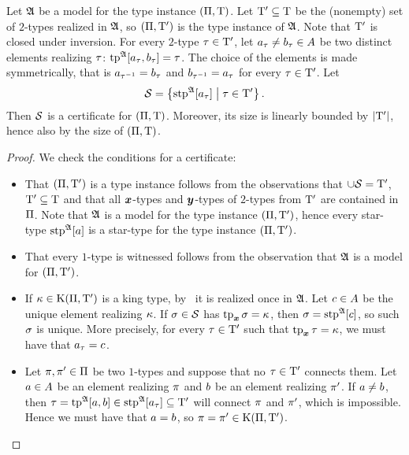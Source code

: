 \begin{lemma}\label{lem:cert-extract}
Let $\mathfrak{A}$ be a model for the type instance $(\Pi,\mathrm{T})$.
Let ${\mathrm{T}'} \subseteq \mathrm{T}$ be the (nonempty) set of $2$-types realized in
$\mathfrak{A}$, so $(\Pi,{\mathrm{T}'})$ is the type instance of $\mathfrak{A}$.
Note that ${\mathrm{T}'}$ is closed under inversion.
For every $2$-type $\tau \in {\mathrm{T}'}$,
let $a_{\tau} \neq b_{\tau} \in A$ be two distinct elements realizing
$\tau$: $\operatorname{tp}^{\mathfrak{A}}[a_{\tau},b_{\tau}] = \tau$. The choice of the
elements is made symmetrically, that is $a_{\tau^{-1}} = b_{\tau}$ and
$b_{\tau^{-1}} = a_{\tau}$ for every $\tau\in{\mathrm{T}'}$.
Let 
\[
  \mathcal{S} = \left\{\operatorname{stp}^{\mathfrak{A}}[a_{\tau}]\mathrel{}\middle|\mathrel{}\tau\in{\mathrm{T}'}\right\}.
\]
Then $\mathcal{S}$ is a certificate for $(\Pi,\mathrm{T})$. Moreover, its size is
linearly bounded by $\left|{\mathrm{T}'}\right|$, hence also by the size of $(\Pi,\mathrm{T})$.
\end{lemma}
\begin{proof}
We check the conditions for a certificate:
\begin{itemize}
  \item[\refcertcond1] That $(\Pi,{\mathrm{T}'})$ is a type instance follows from
  the observations that $\cup\mathcal{S} = {\mathrm{T}'}$, ${\mathrm{T}'} \subseteq \mathrm{T}$ and that all $\bm{x}$-types
  and $\bm{y}$-types of $2$-types from ${\mathrm{T}'}$ are contained in $\Pi$. Note that
  $\mathfrak{A}$ is a model for the type instance $(\Pi,{\mathrm{T}'})$, hence every
  star-type $\operatorname{stp}^{\mathfrak{A}}[a]$ is a star-type for the type instance
  $(\Pi,{\mathrm{T}'})$.
  \item[\refcertcond2] That every $1$-type is witnessed follows from the
  observation that $\mathfrak{A}$ is a model for $(\Pi,{\mathrm{T}'})$.
  \item[\refcertcond3] If $\kappa \in \mathrm{K}(\Pi,{\mathrm{T}'})$ is a king type,
  by~ it is realized once in $\mathfrak{A}$.
  Let $c \in A$ be the unique element realizing $\kappa$.
  If $\sigma \in \mathcal{S}$ has $\operatorname{tp}_{\bm{x}}\sigma = \kappa$, then $\sigma = \operatorname{stp}^{\mathfrak{A}}[c]$,
  so such $\sigma$ is unique. More precisely, for every $\tau\in{\mathrm{T}'}$ such
  that $\operatorname{tp}_{\bm{x}}\tau = \kappa$, we must have that $a_{\tau} = c$.
  \item[\refcertcond4] Let $\pi, {\pi'} \in \Pi$ be two $1$-types and
  suppose that no $\tau\in{\mathrm{T}'}$ connects them. Let $a\in A$ be an element realizing
  $\pi$ and $b$ be an element realizing ${\pi'}$. If $a \neq b$, then
  $\tau = \operatorname{tp}^{\mathfrak{A}}[a,b] \in \operatorname{stp}^{\mathfrak{A}}[a_\tau] \subseteq {\mathrm{T}'}$ will
  connect $\pi$ and ${\pi'}$, which is impossible. Hence we must have that
  $a = b$, so $\pi = {\pi'} \in \mathrm{K}(\Pi,{\mathrm{T}'})$.
\end{itemize}
\end{proof}

